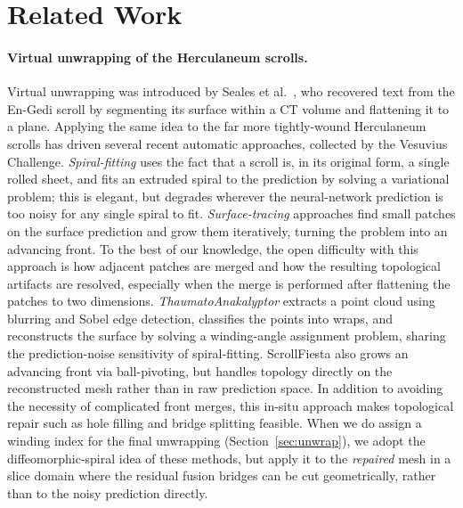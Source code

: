 \section{Related Work}

\paragraph{Virtual unwrapping of the Herculaneum scrolls.} Virtual unwrapping was introduced by Seales et al.~, who recovered text from the En-Gedi scroll by segmenting its surface within a CT volume and flattening it to a plane. Applying the same idea to the far more tightly-wound Herculaneum scrolls has driven several recent automatic approaches, collected by the Vesuvius Challenge. {\em Spiral-fitting} \cite{henderson2026virtually} uses the fact that a scroll is, in its original form, a single rolled sheet, and fits an extruded spiral to the prediction by solving a variational problem; this is elegant, but degrades wherever the neural-network prediction is too noisy for any single spiral to fit. {\em Surface-tracing} approaches find small patches on the surface prediction and grow them iteratively, turning the problem into an advancing front. To the best of our knowledge, the open difficulty with this approach is how adjacent patches are merged and how the resulting topological artifacts are resolved, especially when the merge is performed after flattening the patches to two dimensions. {\em ThaumatoAnakalyptor} extracts a point cloud using blurring and Sobel edge detection, classifies the points into wraps, and reconstructs the surface by solving a winding-angle assignment problem, sharing the prediction-noise sensitivity of spiral-fitting. ScrollFiesta also grows an advancing front via ball-pivoting, but handles topology directly on the reconstructed mesh rather than in raw prediction space. In addition to avoiding the necessity of complicated front merges, this in-situ approach makes topological repair such as hole filling and bridge splitting feasible. When we do assign a winding index for the final unwrapping (Section~\ref{sec:unwrap}), we adopt the diffeomorphic-spiral idea of these methods, but apply it to the {\em repaired} mesh in a slice domain where the residual fusion bridges can be cut geometrically, rather than to the noisy prediction directly.

